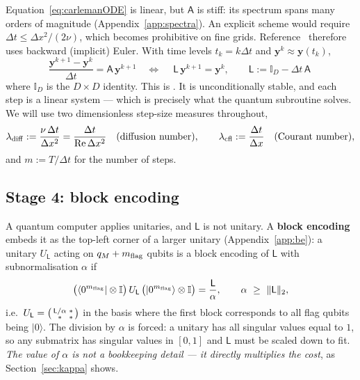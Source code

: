 \documentclass[11pt,a4paper]{article}
\theoremstyle{plain}
\theoremstyle{definition}
\theoremstyle{remark}
\newcommand{\Rey}{\mathrm{Re}}
\newcommand{\ket}[1]{\lvert #1 \rangle}
\newcommand{\bra}[1]{\langle #1 \rvert}
\newcommand{\norm}[1]{\lVert #1 \rVert}
\newcommand{\Id}{\mathbb{I}}
\newcommand{\yvec}{\bm{y}}
\newcommand{\Lmat}{\mathsf{L}}
\newcommand{\Amat}{\mathsf{A}}
\begin{document}
Equation~\eqref{eq:carlemanODE} is linear, but $\Amat$ is stiff: its spectrum
spans many orders of magnitude (Appendix~\ref{app:spectra}).  An explicit scheme
would require $\Delta t\le\Delta x^2/(2\nu)$, which becomes prohibitive on fine
grids.  Reference~\cite{Setty2026} therefore uses backward (implicit) Euler.
With time levels $t_k=k\Delta t$ and $\yvec^k\approx\yvec(t_k)$,
\begin{equation}
\frac{\yvec^{k+1}-\yvec^{k}}{\Delta t}=\Amat\,\yvec^{k+1}
\quad\Longleftrightarrow\quad
\boxed{\ \Lmat\,\yvec^{k+1}=\yvec^{k},\qquad
\Lmat:=\Id_D-\Delta t\,\Amat\ }
\label{eq:implicit}
\end{equation}
where $\Id_D$ is the $D\times D$ identity.  This is
\cite[Eq.~(E.8)]{Setty2026}.  It is unconditionally stable, and each step is a
linear system --- which is precisely what the quantum subroutine solves.  We
will use two dimensionless step-size measures throughout,
\begin{equation}
\lambda_{\rm diff}:=\frac{\nu\,\Delta t}{\Delta x^{2}}
=\frac{\Delta t}{\Rey\,\Delta x^{2}}
\quad\text{(diffusion number)},
\qquad
\lambda_{\rm cfl}:=\frac{\Delta t}{\Delta x}
\quad\text{(Courant number)},
\label{eq:lambdas}
\end{equation}
and $m:=T/\Delta t$ for the number of steps.

\subsection{Stage 4: block encoding}
\label{sec:be}

A quantum computer applies unitaries, and $\Lmat$ is not unitary.  A
\textbf{block encoding} embeds it as the top-left corner of a larger unitary
(Appendix~\ref{app:be}): a unitary $U_{\Lmat}$ acting on $q_M+m_{\rm flag}$
qubits is a block encoding of $\Lmat$ with subnormalisation $\alpha$ if
\begin{equation}
\bigl(\bra{0^{m_{\rm flag}}}\otimes\Id\bigr)\,U_{\Lmat}\,
\bigl(\ket{0^{m_{\rm flag}}}\otimes\Id\bigr)=\frac{\Lmat}{\alpha},
\qquad \alpha\ \ge\ \norm{\Lmat}_2 ,
\label{eq:bedef}
\end{equation}
i.e.\ $U_\Lmat=\begin{psmallmatrix}\Lmat/\alpha&\ast\\\ast&\ast\end{psmallmatrix}$
in the basis where the first block corresponds to all flag qubits being
$\ket{0}$.  The division by $\alpha$ is forced: a unitary has all singular
values equal to $1$, so any submatrix has singular values in $[0,1]$ and
$\Lmat$ must be scaled down to fit.  \emph{The value of $\alpha$ is not a
bookkeeping detail --- it directly multiplies the cost}, as
Section~\ref{sec:kappa} shows.
\end{document}
